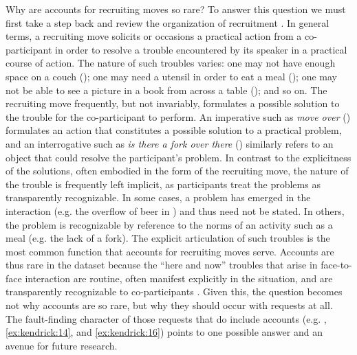 \documentclass[output=paper,nonflat,modfont,draft]{langsci/langscibook}
\begin{document}
Why are accounts for recruiting moves so rare? To answer this question we must first take a step back and review the organization of recruitment \citep{KendrickDrew2016}. In general terms, a recruiting move solicits or occasions a practical action from a co-participant in order to resolve a trouble encountered by its speaker in a practical course of action. The nature of such troubles varies: one may not have enough space on a couch (); one may need a utensil in order to eat a meal (); one may not be able to see a picture in a book from across a table (); and so on. The recruiting move frequently, but not invariably, formulates a possible solution to the trouble for the co-participant to perform. An imperative such as \textit{move over} () formulates an action that constitutes a possible solution to a practical problem, and an interrogative such as \textit{is there a fork over there} () similarly refers to an object that could resolve the participant’s problem. In contrast to the explicitness of the solutions, often embodied in the form of the recruiting move, the nature of the trouble is frequently left implicit, as participants treat the problems as transparently recognizable. In some cases, a problem has emerged in the interaction (e.g. the overflow of beer in ) and thus need not be stated. In others, the problem is recognizable by reference to the norms of an activity such as a meal (e.g. the lack of a fork). The explicit articulation of such troubles is the most common function that accounts for recruiting moves serve. Accounts are thus rare in the dataset because the “here and now” troubles that arise in face-to-face interaction are routine, often manifest explicitly in the situation, and are transparently recognizable to co-participants \citep[see also][647]{BaranovaDingemanse2016}. Given this, the question becomes not why accounts are so rare, but why they should occur with requests at all. The fault-finding character of those requests that do include accounts (e.g. , \ref{ex:kendrick:14}, and \ref{ex:kendrick:16}) points to one possible answer and an avenue for future research.
\end{document}
